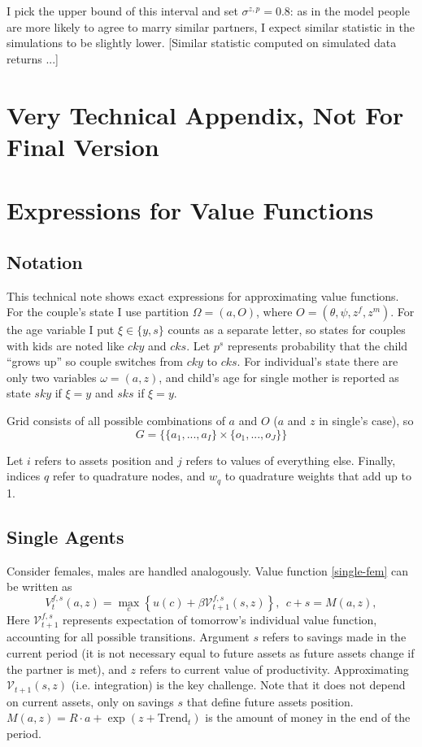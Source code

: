 \documentclass[12pt,letter]{article}
\begin{document}
I pick the upper bound of this interval and set $\sigma^{z,p} = 0.8$: as in the model people are more likely to agree to marry similar partners, I expect similar statistic in the simulations to be slightly lower. [Similar statistic computed on simulated data returns ...]


\newpage
\section*{Very Technical Appendix, Not For Final Version}
\section{Expressions for Value Functions}
\subsection{Notation}
This technical note shows exact expressions for approximating value functions. For the couple's state I use partition $\Omega = (a,O)$, where $O = (\theta,\psi,z^f,z^m)$. For the age variable I put $\xi\in\{y,s\}$ counts as a separate letter, so states for couples with kids are noted like $cky$ and $cks$. Let $p^s$ represents probability that the child ``grows up'' so couple switches from $cky$ to $cks$. For individual's state there are only two variables $\omega = (a,z)$, and child's age for single mother is reported as state $sky$ if $\xi = y$ and $sks$ if $\xi = y$. 

Grid consists of all possible combinations of $a$ and $O$ ($a$ and $z$ in single's case), so \[G = \{ \{a_1,...,a_I\} \times \{o_1,...,o_J\}\}\]

Let $i$ refers to assets position and $j$ refers to values of everything else. Finally, indices $q$ refer to quadrature nodes, and $w_q$ to quadrature weights that add up to 1.

\subsection{Single Agents}
Consider females, males are handled analogously. Value function \ref{single-fem} can be written as
\[V^{f,s}_t(a,z) = \max\limits_{c} \left\{ u(c) + \beta \mathcal{V}^{f,s}_{t+1}(s,z)\right\}, \ \ c + s = M(a,z),\]
Here  $\mathcal{V}^{f,s}_{t+1}$ represents expectation of tomorrow's individual value function, accounting for all possible transitions. Argument $s$ refers to savings made in the current period (it is not necessary equal to future assets as future assets change if the partner is met), and $z$ refers to current value of productivity. Approximating $\mathcal{V}_{t+1}(s,z)$ (i.e. integration) is the key challenge. Note that it does not depend on current assets, only on savings $s$ that define future assets position. $M(a,z) = R\cdot a + \exp(z + \text{Trend}_t)$ is the amount of money in the end of the period.
\end{document}
